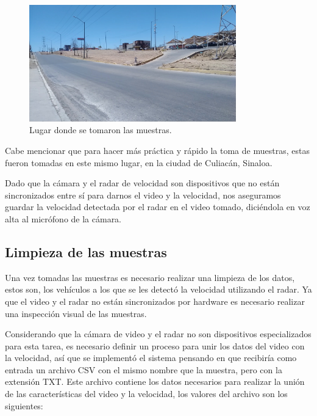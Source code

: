 \begin{figure}[H]
    \centering
    \includegraphics[width=0.8\textwidth]{Metodologia/imgs/LugarMuestras.jpg}
    \caption{Lugar donde se tomaron las muestras.}
    \label{fig:LugarMuestrasDataset}
\end{figure}

Cabe mencionar que para hacer más práctica y rápido la toma de muestras, estas fueron tomadas en este mismo lugar, en la ciudad de Culiacán, Sinaloa.

Dado que la cámara y el radar de velocidad son dispositivos que no están sincronizados entre sí para darnos el video y la velocidad, nos aseguramos guardar la velocidad detectada por el radar en el video tomado, diciéndola en voz alta al micrófono de la cámara.


\subsection{Limpieza de las muestras}

Una vez tomadas las muestras es necesario realizar una limpieza de los datos, estos son, los vehículos a los que se les detectó la velocidad utilizando el radar. Ya que el video y el radar no están sincronizados por hardware es necesario realizar una inspección visual de las muestras.

Considerando que la cámara de video y el radar no son dispositivos especializados para esta tarea, es necesario definir un proceso para unir los datos del video con la velocidad, así que se implementó el sistema pensando en que recibiría como entrada un archivo CSV con el mismo nombre que la muestra, pero con la extensión TXT. Este archivo contiene los datos necesarios para realizar la unión de las características del video y la velocidad, los valores del archivo son los siguientes:

